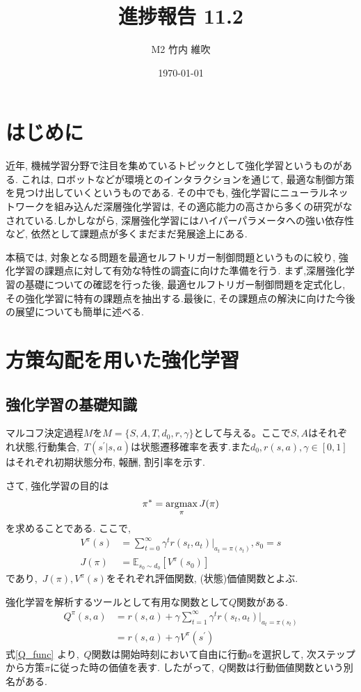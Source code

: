 \documentclass{jsarticle}
\title{\large{\bf{進捗報告 11.2}}}
\author{M2 竹内 維吹}
\date{\today}
\newcommand{\argmax}{\mathop{\rm argmax}\limits}
\newcommand{\expect}{\mathbb{E}}
\begin{document}
\maketitle


\section{はじめに}
近年, 機械学習分野で注目を集めているトピックとして強化学習というものがある. これは, ロボットなどが環境とのインタラクションを通じて, 最適な制御方策を見つけ出していくというものである. その中でも, 強化学習にニューラルネットワークを組み込んだ深層強化学習は, その適応能力の高さから多くの研究がなされている.しかしながら, 深層強化学習にはハイパーパラメータへの強い依存性など, 依然として課題点が多くまだまだ発展途上にある.\par
本稿では, 対象となる問題を最適セルフトリガー制御問題というものに絞り, 強化学習の課題点に対して有効な特性の調査に向けた準備を行う. まず,深層強化学習の基礎についての確認を行った後, 最適セルフトリガー制御問題を定式化し, その強化学習に特有の課題点を抽出する.最後に, その課題点の解決に向けた今後の展望についても簡単に述べる.

\section{方策勾配を用いた強化学習}
\subsection{強化学習の基礎知識}
マルコフ決定過程$M$を$M=\{S,A,T,d_0,r,\gamma\}$として与える。ここで$S,A$はそれぞれ状態,行動集合,~$T(s^{'}|s,a)$は状態遷移確率を表す.また$d_0,r(s,a),\gamma\in[0,1]$はそれぞれ初期状態分布, 報酬, 割引率を示す.\par
さて, 強化学習の目的は
\begin{equation}
	\pi^{*}=\argmax_{\pi}J(\pi) \label{purpose_of_rl}
\end{equation}を求めることである. ここで, 
\begin{align}
	V^{\pi}(s) &= \sum_{t=0}^{\infty}\gamma^tr(s_t, a_t)|_{a_t=\pi(s_t)}, s_0 = s\\
	J(\pi) &= \expect_{s_0\sim d_0}[V^{\pi}(s_0)]
\end{align}
であり,~$J(\pi), V^{\pi}(s)$をそれぞれ評価関数, (状態)価値関数とよぶ.\par
強化学習を解析するツールとして有用な関数として$Q$関数がある.
\begin{align}
	Q^{\pi}(s,a) &= r(s, a) + \gamma\sum_{t=1}^{\infty}\gamma^tr(s_t, a_t)|_{a_t=\pi(s_t)} \nonumber\\
			    &= r(s, a) + \gamma V^{\pi}(s^{\prime}) \label{Q_func}
\end{align}
式\eqref{Q_func} より,~$Q$関数は開始時刻において自由に行動$a$を選択して, 次ステップから方策$\pi$に従った時の価値を表す. したがって,~$Q$関数は行動価値関数という別名がある.
\end{document}
